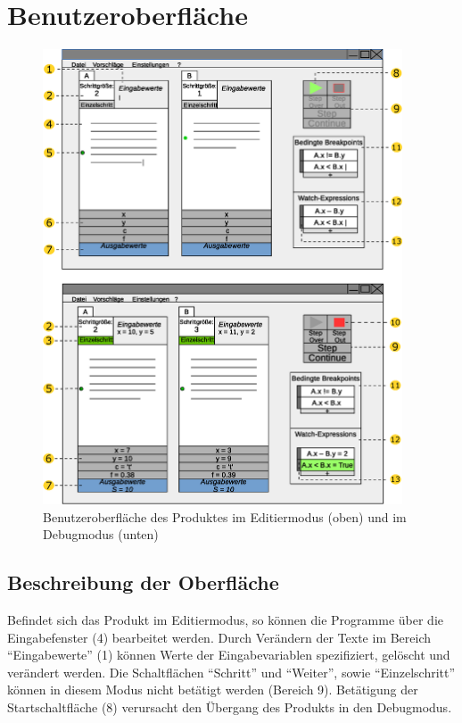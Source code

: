 \documentclass[parskip=full]{scrartcl}
\begin{document}
	
\newpage
\section{Benutzeroberfläche}
\begin{figure}[!ht] 
    \vspace{-10pt}
    \centering
       \includegraphics[width=0.95\textwidth]{skizzeFull_v2.eps}
       \caption{
         Benutzeroberfläche des Produktes im Editiermodus (oben) und im Debugmodus
         (unten)
       }
    \label{fig:Bild4}
\end{figure}

\newpage
    \subsection{Beschreibung der Oberfläche}
        Befindet sich das Produkt im \gls{Editiermodus}, so können die Programme über die 
        Eingabefenster (4) bearbeitet werden.
        Durch Verändern der Texte im Bereich \enquote{Eingabewerte} (1) können Werte der Eingabevariablen
        spezifiziert, gelöscht und verändert werden. 
        Die Schaltflächen \enquote{\gls{Schritt}} und \enquote{Weiter}, sowie \enquote{\gls{Einzelschritt}} können in diesem Modus nicht betätigt
        werden (Bereich 9). Betätigung der Startschaltfläche (8) verursacht den Übergang des Produkts in den \gls{Debugmodus}.
        
\end{document}
